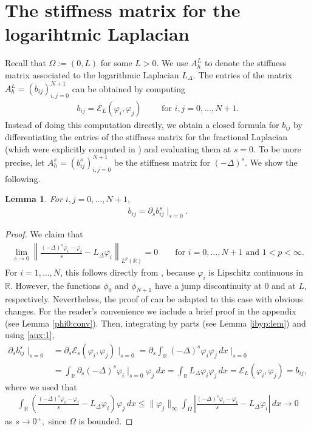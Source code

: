\documentclass[10 pt]{article}
\newtheorem{lemma}[theorem]{Lemma}
\numberwithin{equation}{section}
\def\R{\mathbb{R}}
\def\cE{\mathcal{E}}
\begin{document}
\section{The stiffness matrix for the logarihtmic Laplacian}\label{sec:stiffness}

Recall that $\Omega:=(0,L)$ for some $L>0$.  We use $A^L_h$ to denote the stiffness matrix associated to the logarithmic Laplacian $L_\Delta.$   The entries of the matrix $A^L_h=(b_{ij})_{i,j=0}^{N+1}$ can be obtained by computing
\begin{align*}
b_{ij}=\cE_L(\varphi_i,\varphi_j)\qquad \text{ for }i,j=0,\ldots,N+1.
\end{align*}
Instead of doing this computation directly, we obtain a closed formula for $b_{ij}$ by differentiating the entries of the stiffness matrix for the fractional Laplacian (which were explicitly computed in \cite{BH17}) and evaluating them at $s=0$.  To be more precise, let $A^s_h=(b_{ij}^s)_{i,j=0}^{N+1}$ be the stiffness matrix for $(-\Delta)^s$. We show the following. 
\begin{lemma}\label{lem:derivative:s:m} For $i,j=0,\ldots,N+1,$
\begin{align*}
    b_{ij}=\partial_s b_{ij}^s \mid_{s=0}.
\end{align*}
\end{lemma}
\begin{proof}
We claim that 
\begin{align}\label{aux:1}
\lim_{s\to 0}\left\|\frac{(-\Delta)^s \varphi_i-\varphi_i}{s}-L_\Delta \varphi_i    \right\|_{L^p(\R)}=0\qquad \text{for $i=0,\ldots,N+1$ and $1<p<\infty$.}
\end{align}
For $i=1,\ldots,N$, this follows directly from \cite[Theorem 1.1]{CW19}, because $\varphi_i$ is Lipschitz continuous in $\R$.  However, the functions $\phi_0$ and $\phi_{N+1}$ have a jump discontinuity at 0 and at $L$, respectively.  Nevertheless, the proof of \cite[Theorem 1.1]{CW19} can be adapted to this case with obvious changes.  For the reader's convenience we include a brief proof in the appendix (see Lemma \ref{phi0:conv}). Then, integrating by parts (see Lemma \ref{ibyp:lem}) and using \eqref{aux:1},
\begin{align*}
\partial_s b_{ij}^s\mid_{s=0}&=\partial_s\cE_s(\varphi_i,\varphi_j)\mid_{s=0}=
\partial_s\int_{\R} (-\Delta)^s\varphi_i \varphi_j\, dx\mid_{s=0}\\
&=\int_{\R} \partial_s(-\Delta)^s\varphi_i\mid_{s=0} \varphi_j\, dx
=\int_{\R} L_\Delta\varphi_i \varphi_j\, dx
=\cE_L(\varphi_i,\varphi_j)=b_{ij},
\end{align*}
where we used that
\begin{align*}
\int_{\R}\left(\frac{(-\Delta)^s \varphi_i-\varphi_i}{s}-L_\Delta \varphi_i  \right)\varphi_j\, dx
\leq \|\varphi_j\|_\infty\int_{\Omega}\left|\frac{(-\Delta)^s \varphi_i-\varphi_i}{s}-L_\Delta \varphi_i  \right|\, dx\to 0
\end{align*}
as $s\to 0^+,$ since $\Omega$ is bounded.
\end{proof}
\end{document}
